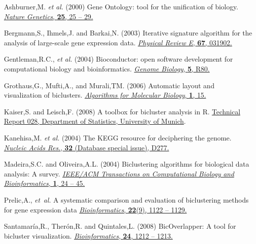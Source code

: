 \documentclass[round]{bioinfo}
\begin{document}
\begin{thebibliography}{6}

Ashburner,M. \emph{et al.} (2000)
Gene Ontology: tool for the unification of biology.
\href{http://dx.doi.org/10.1038/75556}{\emph{Nature Genetics}, {\bf 25}, 25 -- 29.}

Bergmann,S., Ihmels,J. and Barkai,N. (2003)
Iterative signature algorithm for the analysis of large-scale gene expression data.
\href{http://dx.doi.org/10.1103/PhysRevE.67.031902 }{\emph{Physical Review E}, {\bf 67}, 031902.}


Gentleman,R.C., \emph{et al.} (2004)
Bioconductor: open software development for computational biology and bioinformatics.
\href{http://dx.doi.org/10.1186/gb-2004-5-10-r80}{\emph{Genome Biology}, {\bf 5}, R80.}

Grothaus,G., Mufti,A., and Murali,TM. (2006)
Automatic layout and visualization of biclusters.
\href{http://dx.doi.org/10.1186/1748-7188-1-15}{\emph{Algorithms for Molecular Biology}, {\bf 1}, 15.}

Kaiser,S. and Leisch,F. (2008)
A toolbox for bicluster analysis in R.
\href{http://epub.ub.uni-muenchen.de/3293/}{Technical Report 028, Department of Statistics, University of Munich}.

Kanehisa,M. \emph{et al.} (2004)
The KEGG resource for deciphering the genome.
\href{http://dx.doi.org/10.1093/nar/gkh063}{\emph{Nucleic Acids Res.}, {\bf 32} (Database special issue), D277.}

Madeira,S.C. and Oliveira,A.L. (2004)
Biclustering algorithms for biological data analysis: A survey.
\href{http://dx.doi.org/10.1109/TCBB.2004.2}{\emph{IEEE/ACM Transactions on Computational Biology and Bioinformatics}, {\bf 1}, 24 -- 45.}

Prelic,A., \emph{et~al.} 
A systematic comparison and evaluation of biclustering methods for gene expression data 
\href{http://dx.doi.org/10.1093/bioinformatics/bt1060}{\emph{Bioinformatics}, {\bf 22}(9), 1122 -- 1129.}

Santamar\'ia,R., Ther\'on,R. and Quintales,L. (2008)
BicOverlapper: A tool for bicluster visualization. 
\href{http://dx.doi.org/10.1093/bioinformatics/btn076}{\emph{Bioinformatics}, {\bf 24}, 1212 -- 1213.}

\end{thebibliography}
\end{document}
